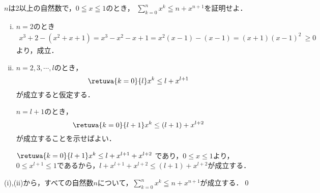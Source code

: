 \begin{problem}
$n$は2以上の自然数で，$0 \leqq x \leqq 1$のとき，
$\displaystyle\sum_{k=0}^nx^k \leqq n+x^{n+1}$を証明せよ．
\end{problem}

\begin{enumerate}[(i)]
  \item $n=2$のとき
  \begin{align*}
    x^3 + 2 - (x^2+x+1) = x^3 -x^2-x+1 = x^2(x-1)-(x-1)
    = (x+1)(x-1)^2 \ \geq 0
  \end{align*}
  より，成立．
  \item $n=2,3,\cdots, l$のとき，
  \[\retuwa{k=0}{l}x^k \leq l + x^{l+1}\]
  が成立すると仮定する．

  $n = l+1$のとき，
  \[\retuwa{k=0}{l+1}x^k \leq (l+1)+x^{l+2}\]
  が成立することを示せばよい．

  $\retuwa{k=0}{l+1}x^k \leq l + x^{l+1}+x^{l+2}$ であり，$0 \leq x \leq 1$より，$0 \leq x^{l+1} \leq 1$であるから，$l + x^{l+1} + x^{l+2} \leq (l+1) + x^{l+2}$が成立する．
\end{enumerate}

(i),(ii)から，すべての自然数$n$について，$\displaystyle\sum_{k=0}^nx^k \leqq n+x^{n+1}$が成立する．\qed
